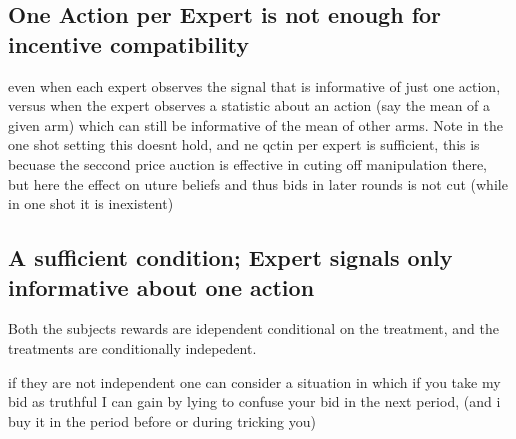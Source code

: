 \subsection{One Action per Expert is not enough for incentive compatibility}

even when each expert observes the signal that is informative of just one action, versus when the expert observes a statistic about an action (say the mean of a given arm) which can still be informative of the mean of other arms. Note in the one shot setting this doesnt hold, and ne qctin per expert is sufficient, this is becuase the seccond price auction is effective in cuting off manipulation there, but here the effect on uture beliefs and thus bids in later rounds is not cut (while in one shot it is inexistent)

\subsection{A sufficient condition; Expert signals only informative about one action}

Both the subjects rewards are idependent conditional on the treatment, and the treatments are conditionally indepedent.

if they are not independent one can consider a situation in which if you take my bid as truthful I can gain by lying to confuse your bid in the next period, (and i buy it in the period before or during tricking you)


